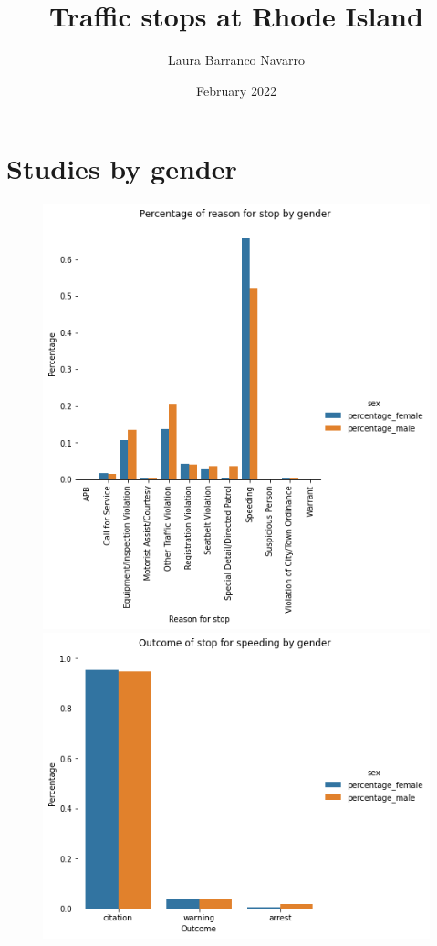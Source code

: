 \documentclass{article}
\title{Traffic stops at Rhode Island}
\author{Laura Barranco Navarro }
\date{February 2022}
\begin{document}
\maketitle
\newpage
\tableofcontents
\newpage
\section{Studies by gender}

 \begin{figure}[h]
\includegraphics[scale=0.34, valign=t]{../figures/reason_gender.png}
\includegraphics[scale=0.34, valign=t]{../figures/speeding_outcome_gender.png}

\end{figure}
\end{document}
